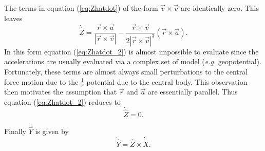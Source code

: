 \documentclass[twocolumn]{article}
\begin{document}
The terms in equation (\ref{eq:Zhatdot}) of the form $\vec v \times \vec v$ are 
identically zero.  This leaves 
\begin{equation}\label{eq:Zhatdot_2}
	\dot{	\hat Z} = \frac{ \vec r \times \vec a} 
	                     { |  \vec r \times \vec v  |} - 
	                \frac{ \vec r \times \vec v} 
	                     { 2 |  \vec r \times \vec v  |^3 } 
	                \left( \vec r \times \vec a \right).
\end{equation}
In this form equation (\ref{eq:Zhatdot_2}) is almost impossible to evaluate 
since the accelerations are usually evaluated via a complex set of model 
(\emph{e.g.} geopotential).  Fortunately, these terms are almost always small 
perturbations to the central force motion due to the $\frac{1}{r}$ potential 
due to the central body.  This observation then motivates the assumption that 
$\vec r$ and $\vec a$ are essentially parallel.  Thus equation 
(\ref{eq:Zhatdot_2}) reduces to 
\begin{equation}\label{eq:Zhatdot_3}
	\dot {\hat Z} = 0.
\end{equation}

Finally $\dot {\hat Y}$ is given by
\begin{equation}\label{eq:Yhatdot}
	\dot{\hat Y} = {\hat Z} \times \dot{\hat X}.
\end{equation}
\end{document}
